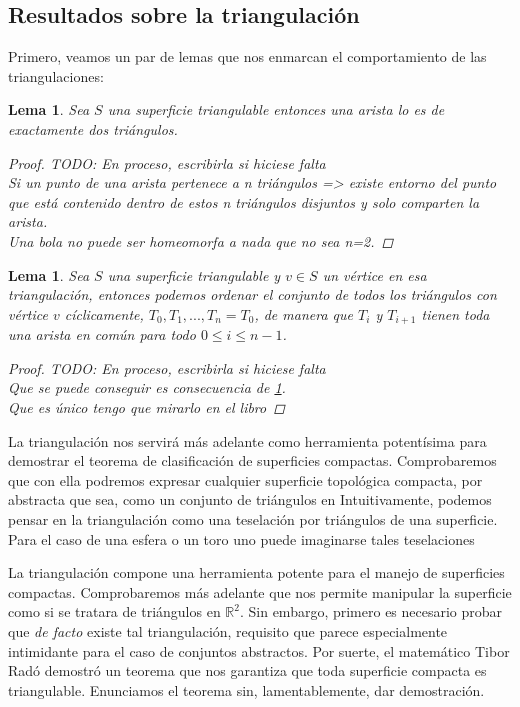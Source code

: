 \documentclass[a4paper,11pt,spanish, twoside, leqno]{tfg-uam}
\newtheorem{lema}[teor]{Lema}
\theoremstyle{definition}
\begin{document}
\subsection*{Resultados sobre la triangulación}

Primero, veamos un par de lemas que nos enmarcan el comportamiento de las triangulaciones:

\begin{lema}\label{lema:lema1detriangulacion}
	Sea $S$ una superficie triangulable entonces una arista lo es de exactamente dos triángulos.
	\begin{proof}
		TODO: En proceso, escribirla si hiciese falta\\
		Si un punto de una arista pertenece a n triángulos => existe entorno del punto que está contenido dentro de estos n triángulos disjuntos y solo comparten la arista.\\
		Una bola no puede ser homeomorfa a nada que no sea n=2.
	\end{proof}
\end{lema}


\begin{lema}\label{lema:lema2detriangulacion}
	Sea  $S$ una superficie triangulable y $v\in S$ un vértice en esa triangulación, entonces podemos ordenar el conjunto de todos los triángulos con vértice $v$ cíclicamente,  $T_0, T_1, ..., T_n = T_0$, de manera que $T_i$ y $T_{i+1}$ tienen toda una arista en común para todo $0\leq i\leq n-1$.
	\begin{proof}
		TODO: En proceso, escribirla si hiciese falta\\
		Que se puede conseguir es consecuencia de \ref{lema:lema1detriangulacion}.\\
		Que es único tengo que mirarlo en el libro
	\end{proof}
\end{lema}

La triangulación nos servirá más adelante como herramienta potentísima para demostrar el teorema de clasificación de superficies compactas. Comprobaremos que con ella podremos expresar cualquier superficie topológica compacta, por abstracta que sea, como un conjunto de triángulos en 
Intuitivamente, podemos pensar en la triangulación como una teselación por triángulos de una superficie. Para el caso de una esfera o un toro uno puede imaginarse tales teselaciones

La triangulación compone una herramienta potente para el manejo de superficies compactas. Comprobaremos más adelante que nos permite manipular la superficie como si se tratara de triángulos en $\mathbb{R}^2$. Sin embargo, primero es necesario probar que \textit{de facto} existe tal triangulación, requisito que parece especialmente intimidante para el caso de conjuntos abstractos. Por suerte, el matemático Tibor Radó demostró un teorema que nos garantiza que toda superficie compacta es triangulable. Enunciamos el teorema sin, lamentablemente, dar demostración.
\end{document}
